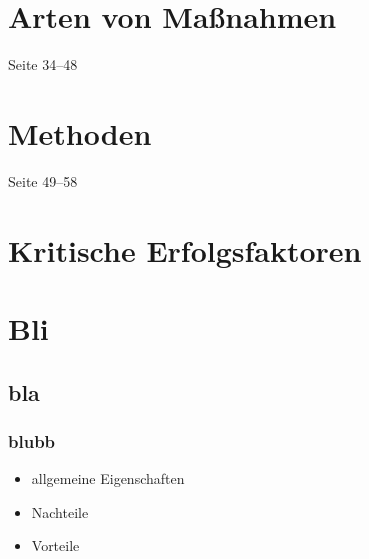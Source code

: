 \documentclass[a4paper, 12pt]{article}
\begin{document}
\section{Arten von Maßnahmen}
Seite 34--48



\section{Methoden}
Seite 49--58



\section{Kritische Erfolgsfaktoren}






\section{Bli}


\subsection{bla}

\subsubsection*{blubb}

\begin{itemize}
  \item allgemeine Eigenschaften
\end{itemize}
\begin{itemize}
  \renewcommand{\labelitemi}{\(-\)}%
  \item Nachteile
\end{itemize}
\begin{itemize}
  \renewcommand{\labelitemi}{+}%
  \item Vorteile
\end{itemize}
\end{document}

